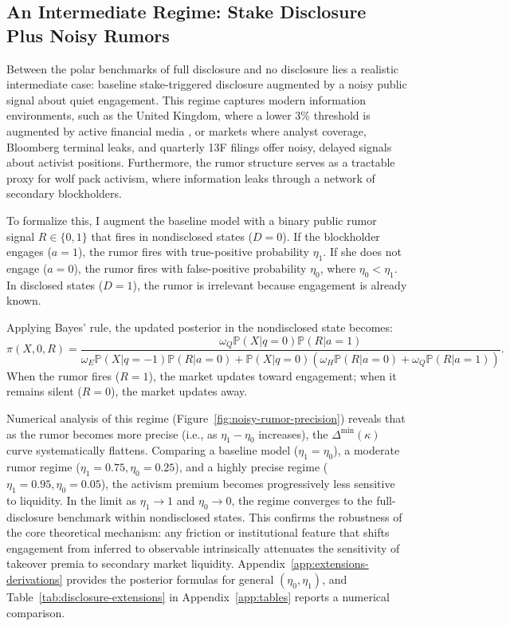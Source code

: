 \documentclass[11pt]{article}
\newcommand{\PP}{\mathbb{P}}
\newcommand{\1}{\mathbf{1}}
\begin{document}
%
\subsection{An Intermediate Regime: Stake Disclosure Plus Noisy Rumors}
\label{sec:noisy_rumors}
%

Between the polar benchmarks of full disclosure and no disclosure lies a realistic intermediate case: baseline stake-triggered disclosure augmented by a noisy public signal about quiet engagement. This regime captures modern information environments, such as the United Kingdom, where a lower 3\% threshold is augmented by active financial media \citep{FangPeress2009}, or markets where analyst coverage, Bloomberg terminal leaks, and quarterly 13F filings offer noisy, delayed signals about activist positions. Furthermore, the rumor structure serves as a tractable proxy for wolf pack activism, where information leaks through a network of secondary blockholders.

To formalize this, I augment the baseline model with a binary public rumor signal $R \in \{0,1\}$ that fires in nondisclosed states ($D=0$). If the blockholder engages ($a=1$), the rumor fires with true-positive probability $\eta_1$. If she does not engage ($a=0$), the rumor fires with false-positive probability $\eta_0$, where $\eta_0 < \eta_1$. In disclosed states ($D=1$), the rumor is irrelevant because engagement is already known.

Applying Bayes' rule, the updated posterior in the nondisclosed state becomes:
\begin{equation}
\pi(X,0,R) = \frac{\omega_Q \PP(X|q=0) \PP(R|a=1)}{\omega_E \PP(X|q=-1)\PP(R|a=0) + \PP(X|q=0)(\omega_H \PP(R|a=0) + \omega_Q \PP(R|a=1))}.
\end{equation}
When the rumor fires ($R=1$), the market updates toward engagement; when it remains silent ($R=0$), the market updates away.

Numerical analysis of this regime (Figure~\ref{fig:noisy-rumor-precision}) reveals that as the rumor becomes more precise (i.e., as $\eta_1 - \eta_0$ increases), the $\Delta^{\min}(\kappa)$ curve systematically flattens. Comparing a baseline model ($\eta_1 = \eta_0$), a moderate rumor regime ($\eta_1 = 0.75, \eta_0 = 0.25$), and a highly precise regime ($\eta_1 = 0.95, \eta_0 = 0.05$), the activism premium becomes progressively less sensitive to liquidity. In the limit as $\eta_1 \to 1$ and $\eta_0 \to 0$, the regime converges to the full-disclosure benchmark within nondisclosed states. This confirms the robustness of the core theoretical mechanism: any friction or institutional feature that shifts engagement from inferred to observable intrinsically attenuates the sensitivity of takeover premia to secondary market liquidity. Appendix~\ref{app:extensions-derivations} provides the posterior formulas for general $(\eta_0,\eta_1)$, and Table~\ref{tab:disclosure-extensions} in Appendix~\ref{app:tables} reports a numerical comparison.
\end{document}

